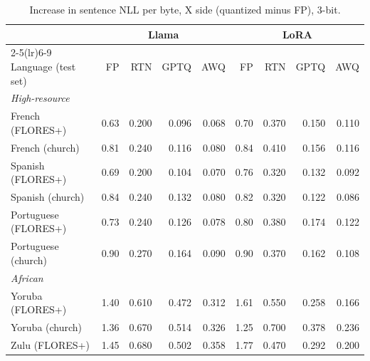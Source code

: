 \begin{table}[htbp]
\centering
\footnotesize
\setlength{\tabcolsep}{3pt}
\caption{Increase in sentence NLL per byte, X side (quantized minus FP), 3-bit.}
\begin{tabular}{lrrrrrrrr}
\toprule
 & \multicolumn{4}{c}{Llama} & \multicolumn{4}{c}{LoRA} \\
\cmidrule(lr){2-5}\cmidrule(lr){6-9}
Language (test set) & FP & RTN & GPTQ & AWQ & FP & RTN & GPTQ & AWQ \\
\midrule
\multicolumn{9}{l}{\textit{High-resource}} \\
French (FLORES+) & 0.63 & \cellcolor{loss!11}0.200 & \cellcolor{loss!5}0.096 & \cellcolor{loss!4}0.068 & 0.70 & \cellcolor{loss!20}0.370 & \cellcolor{loss!8}0.150 & \cellcolor{loss!6}0.110 \\
French (church) & 0.81 & \cellcolor{loss!13}0.240 & \cellcolor{loss!6}0.116 & \cellcolor{loss!4}0.080 & 0.84 & \cellcolor{loss!22}0.410 & \cellcolor{loss!9}0.156 & \cellcolor{loss!6}0.116 \\
Spanish (FLORES+) & 0.69 & \cellcolor{loss!11}0.200 & \cellcolor{loss!6}0.104 & \cellcolor{loss!4}0.070 & 0.76 & \cellcolor{loss!17}0.320 & \cellcolor{loss!7}0.132 & \cellcolor{loss!5}0.092 \\
Spanish (church) & 0.84 & \cellcolor{loss!13}0.240 & \cellcolor{loss!7}0.132 & \cellcolor{loss!4}0.080 & 0.82 & \cellcolor{loss!17}0.320 & \cellcolor{loss!7}0.122 & \cellcolor{loss!5}0.086 \\
Portuguese (FLORES+) & 0.73 & \cellcolor{loss!13}0.240 & \cellcolor{loss!7}0.126 & \cellcolor{loss!4}0.078 & 0.80 & \cellcolor{loss!21}0.380 & \cellcolor{loss!9}0.174 & \cellcolor{loss!7}0.122 \\
Portuguese (church) & 0.90 & \cellcolor{loss!15}0.270 & \cellcolor{loss!9}0.164 & \cellcolor{loss!5}0.090 & 0.90 & \cellcolor{loss!20}0.370 & \cellcolor{loss!9}0.162 & \cellcolor{loss!6}0.108 \\
\midrule \multicolumn{9}{l}{\textit{African}} \\
Yoruba (FLORES+) & 1.40 & \cellcolor{loss!33}0.610 & \cellcolor{loss!26}0.472 & \cellcolor{loss!17}0.312 & 1.61 & \cellcolor{loss!30}0.550 & \cellcolor{loss!14}0.258 & \cellcolor{loss!9}0.166 \\
Yoruba (church) & 1.36 & \cellcolor{loss!37}0.670 & \cellcolor{loss!28}0.514 & \cellcolor{loss!18}0.326 & 1.25 & \cellcolor{loss!38}0.700 & \cellcolor{loss!21}0.378 & \cellcolor{loss!13}0.236 \\
Zulu (FLORES+) & 1.45 & \cellcolor{loss!37}0.680 & \cellcolor{loss!27}0.502 & \cellcolor{loss!20}0.358 & 1.77 & \cellcolor{loss!26}0.470 & \cellcolor{loss!16}0.292 & \cellcolor{loss!11}0.200 \\

\end{tabular}
\end{table}
